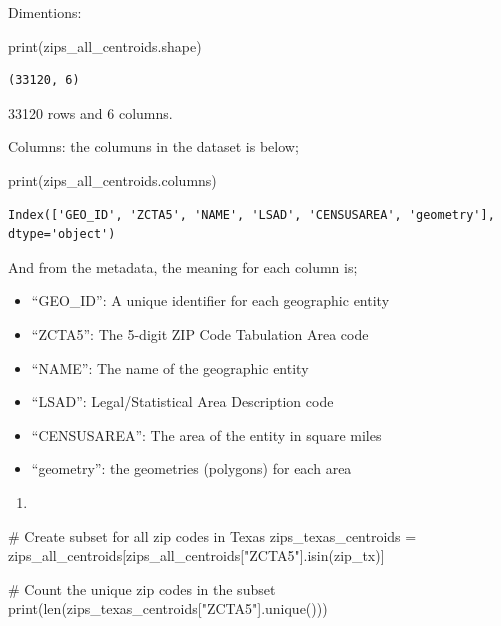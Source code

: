 \documentclass[
  letterpaper,
  DIV=11,
  numbers=noendperiod]{scrartcl}
\newenvironment{Shaded}{\begin{snugshade}}{\end{snugshade}}
\newcommand{\BuiltInTok}[1]{\textcolor[rgb]{0.00,0.23,0.31}{#1}}
\newcommand{\CommentTok}[1]{\textcolor[rgb]{0.37,0.37,0.37}{#1}}
\newcommand{\NormalTok}[1]{\textcolor[rgb]{0.00,0.23,0.31}{#1}}
\newcommand{\OperatorTok}[1]{\textcolor[rgb]{0.37,0.37,0.37}{#1}}
\newcommand{\StringTok}[1]{\textcolor[rgb]{0.13,0.47,0.30}{#1}}
\providecommand{\tightlist}{%
  \setlength{\itemsep}{0pt}\setlength{\parskip}{0pt}}\usepackage{longtable,booktabs,array}
\begin{document}
Dimentions:

\begin{Shaded}
\begin{Highlighting}[]
\BuiltInTok{print}\NormalTok{(zips\_all\_centroids.shape)}
\end{Highlighting}
\end{Shaded}

\begin{verbatim}
(33120, 6)
\end{verbatim}

33120 rows and 6 columns.

Columns: the columuns in the dataset is below;

\begin{Shaded}
\begin{Highlighting}[]
\BuiltInTok{print}\NormalTok{(zips\_all\_centroids.columns)}
\end{Highlighting}
\end{Shaded}

\begin{verbatim}
Index(['GEO_ID', 'ZCTA5', 'NAME', 'LSAD', 'CENSUSAREA', 'geometry'], dtype='object')
\end{verbatim}

And from the metadata, the meaning for each column is;

\begin{itemize}
\item
  ``GEO\_ID'': A unique identifier for each geographic entity
\item
  ``ZCTA5'': The 5-digit ZIP Code Tabulation Area code
\item
  ``NAME'': The name of the geographic entity
\item
  ``LSAD'': Legal/Statistical Area Description code
\item
  ``CENSUSAREA'': The area of the entity in square miles
\item
  ``geometry'': the geometries (polygons) for each area
\end{itemize}

\begin{enumerate}
\def\labelenumi{\arabic{enumi}.}
\setcounter{enumi}{1}
\tightlist
\item
\end{enumerate}

\begin{Shaded}
\begin{Highlighting}[]
\CommentTok{\# Create subset for all zip codes in Texas}
\NormalTok{zips\_texas\_centroids }\OperatorTok{=}\NormalTok{ zips\_all\_centroids[zips\_all\_centroids[}\StringTok{"ZCTA5"}\NormalTok{].isin(zip\_tx)]}

\CommentTok{\# Count the unique zip codes in the subset}
\BuiltInTok{print}\NormalTok{(}\BuiltInTok{len}\NormalTok{(zips\_texas\_centroids[}\StringTok{"ZCTA5"}\NormalTok{].unique()))}
\end{Highlighting}
\end{Shaded}
\end{document}
